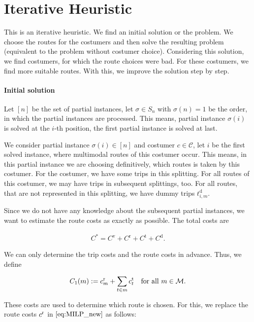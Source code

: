 \section{Iterative Heuristic}

This is an iterative heuristic. We find an initial solution or the problem. We choose the routes for the costumers and then solve the resulting problem (equivalent to the problem without costumer choice). Considering this solution, we find costumers, for which the route choices were bad. For these costumers, we find more suitable routes. With this, we improve the solution step by step.

\paragraph{Initial solution} \parfill

Let $[n]$ be the set of partial instances, let $\sigma\in S_n$ with $\sigma(n)=1$ be the order, in which the partial instances are processed. This means, partial instance $\sigma(i)$ is solved at the $i$-th position, the first partial instance is solved at last.

We consider partial instance $\sigma(i)\in [n]$ and costumer $c\in\mathcal{C}$, let $i$ be the first solved instance, where multimodal routes of this costumer occur. This means, in this partial instance we are choosing definitively, which routes is taken by this costumer. For the costumer, we have some trips in this splitting. For all routes of this costumer, we may have trips in subsequent splittings, too. For all routes, that are not represented in this splitting, we have dummy trips $t^{\operatorname{d}}_{i,m}$.

Since we do not have any knowledge about the subsequent partial instances, we want to estimate the route costs as exactly as possible. The total costs are

\begin{align}
	C^* = C^{\operatorname{v}} + C^{\operatorname{r}} + C^{\operatorname{t}} + C^{\operatorname{d}}.
\end{align}

We can only determine the trip costs and the route costs in advance. Thus, we define

\begin{align}
	C_1(m) := c^{\operatorname{r}}_m + \sum_{t\in m}c^{\operatorname{t}}_t & & \text{for all } m\in\mathcal{M}.
\end{align}

These costs are used to determine which route is chosen. For this, we replace the route costs $c^{\operatorname{r}}$ in $\eqref{eq:MILP_new}$ as follows:

